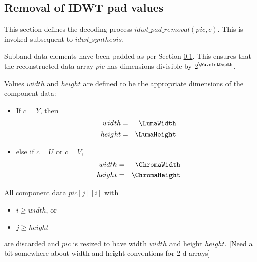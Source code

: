 \subsection{Removal of IDWT pad values}

This section defines the decoding process $idwt\_pad\_removal(pic, c)$. This
is invoked subsequent to $idwt\_synthesis$.

Subband data elements have been padded as per Section \ref{}.
This ensures that the reconstructed data array $pic$ has dimensions divisible
by $2^\WaveletDepth$.

Values $width$ and $height$ are defined to be the appropriate dimensions
of the component data:

\begin{itemize}
\item If $c=Y$, then
\begin{eqnarray*}
width & =& \LumaWidth \\
height & =& \LumaHeight
\end{eqnarray*}
\item else if $c=U$ or $c=V$,
\begin{eqnarray*}
width & =& \ChromaWidth \\
height & =& \ChromaHeight
\end{eqnarray*}
\end{itemize}

All component data $pic[j][i]$ with

\begin{itemize}
\item $i\geq width$, or
\item $j\geq height$
\end{itemize}

are discarded and $pic$ is resized to have width $width$ and height $height$.
[Need a bit somewhere about width and height conventions for 2-d arrays]